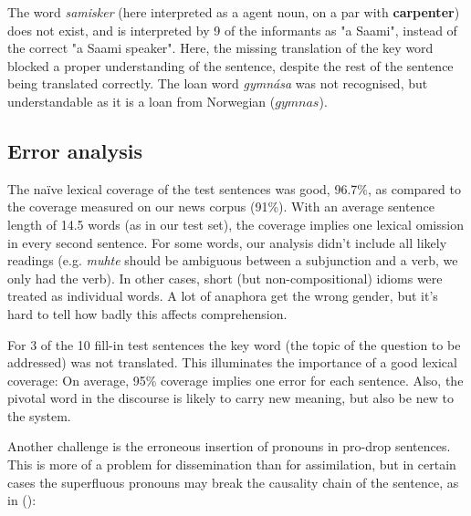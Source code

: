 \documentclass{book}
\begin{document}

The word \textit{samisker} (here interpreted as a agent noun, on a par
with \textbf{carpenter}) does not exist, and is interpreted by 9 of
the informants as "a Saami", instead of the correct "a Saami speaker".
Here, the missing translation of the key word blocked a proper
understanding of the sentence, despite the rest of the sentence being
translated correctly. The loan word \textit{gymn\'{a}sa} was not
recognised, but understandable as it is a loan from Norwegian
($gymnas$).



\subsection{Error analysis}



The na\"{i}ve lexical coverage of the test sentences was good, 96.7\%, 
as compared to the coverage measured on our news corpus (91\%). With
an average sentence length of 14.5 words (as in our test set), the coverage
implies one lexical omission in every second sentence. For
some words, our analysis didn't include all likely readings (e.g.
\textit{muhte} should be ambiguous between a subjunction and a verb,
we only had the verb). In other cases, short (but non-compositional)
idioms were treated as individual words. A lot of anaphora get the
wrong gender, but it's hard to tell how badly this affects
comprehension.

For 3 of the 10 fill-in test sentences the key word (the topic of
the question to be addressed) was not translated. This illuminates
the importance of a good lexical coverage: On average, 95\% coverage implies
one error for each sentence. Also, the pivotal word in the discourse
is likely to carry new meaning, but also be new to
the system. 

Another challenge is the erroneous insertion of pronouns in pro-drop
sentences. This is more of a problem for dissemination than for
assimilation, but in certain cases the superfluous pronouns may
break the causality chain of the sentence, as in ():

{}
\end{document}
